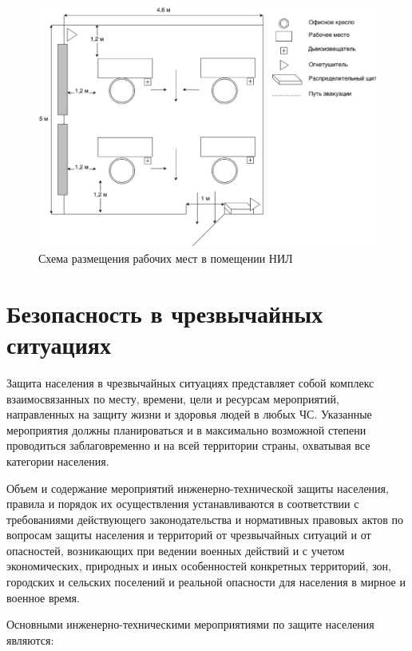 \begin{figure}
    \begin{center}
       \includegraphics[width=1\textwidth]{graphics/work_places.eps}
    \end{center}
    \caption{Схема размещения рабочих мест в помещении НИЛ}
    \label{fig:work_places}
\end{figure}



\section{Безопасность в чрезвычайных ситуациях}

Защита населения в чрезвычайных ситуациях представляет собой комплекс
взаимосвязанных по месту, времени, цели и ресурсам мероприятий, направленных на
защиту жизни и здоровья людей в любых ЧС.  Указанные мероприятия должны
планироваться и в максимально возможной степени проводиться заблаговременно и на
всей территории страны, охватывая все категории населения.

Объем и содержание мероприятий инженерно-технической защиты населения, правила и
порядок их осуществления устанавливаются в соответствии с требованиями
действующего законодательства и нормативных правовых актов по вопросам защиты
населения и территорий от чрезвычайных ситуаций и от опасностей, возникающих при
ведении военных действий и с учетом экономических, природных и иных особенностей
конкретных территорий, зон, городских и сельских поселений и реальной опасности
для населения в мирное и военное время.

Основными инженерно-техническими мероприятиями по защите населения являются:


